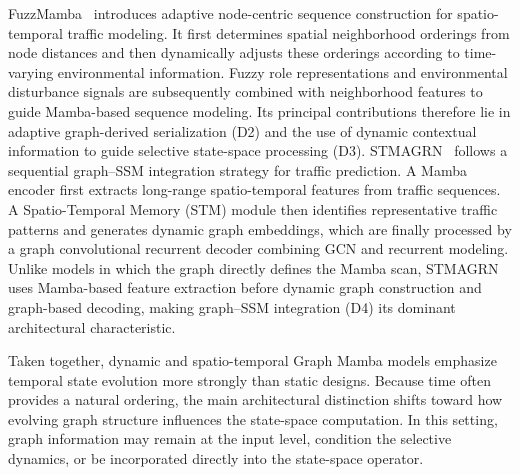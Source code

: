 \documentclass[acmsmall]{acmart}
\begin{document}
FuzzMamba~\cite{chen2026modeling} introduces adaptive node-centric sequence construction for
spatio-temporal traffic modeling. It first determines spatial neighborhood
orderings from node distances and then dynamically adjusts these orderings
according to time-varying environmental information. Fuzzy role
representations and environmental disturbance signals are subsequently
combined with neighborhood features to guide Mamba-based sequence modeling.
Its principal contributions therefore lie in adaptive graph-derived
serialization (D2) and the use of dynamic contextual information to guide
selective state-space processing (D3).
STMAGRN~\cite{zhang2025spatio}  follows a sequential graph--SSM integration strategy for traffic
prediction. A Mamba encoder first extracts long-range spatio-temporal features
from traffic sequences. A Spatio-Temporal Memory (STM) module then identifies
representative traffic patterns and generates dynamic graph embeddings, which
are finally processed by a graph convolutional recurrent decoder combining
GCN and recurrent modeling. Unlike models in which the graph directly defines
the Mamba scan, STMAGRN uses Mamba-based feature extraction before dynamic
graph construction and graph-based decoding, making graph--SSM integration
(D4) its dominant architectural characteristic.


Taken together, dynamic and spatio-temporal Graph Mamba models emphasize temporal state evolution more strongly than static designs. Because time often provides a natural ordering, the main architectural distinction shifts toward how evolving graph structure influences the state-space computation. In this setting, graph information may remain at the input level, condition the selective dynamics, or be incorporated directly into the state-space operator.
\end{document}

